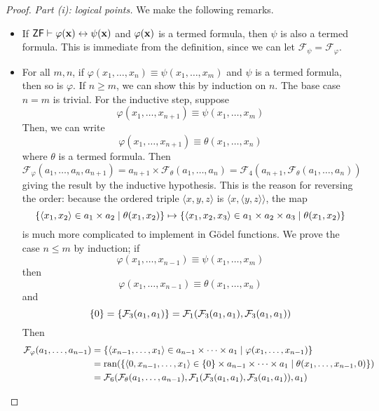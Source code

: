 \begin{proof}
    \emph{Part (i): logical points.}
    We make the following remarks.
    \begin{itemize}
        \item If \( \mathsf{ZF} \vdash \varphi(\vb x) \leftrightarrow \psi(\vb x) \) and \( \varphi(\vb x) \) is a termed formula, then \( \psi \) is also a termed formula.
        This is immediate from the definition, since we can let \( \mathcal F_\psi = \mathcal F_\varphi \).
        \item For all \( m, n \), if \( \varphi(x_1, \dots, x_n) \equiv \psi(x_1, \dots, x_m) \) and \( \psi \) is a termed formula, then so is \( \varphi \).
        If \( n \geq m \), we can show this by induction on \( n \).
        The base case \( n = m \) is trivial.
        For the inductive step, suppose
        \[ \varphi(x_1, \dots, x_{n+1}) \equiv \psi(x_1, \dots, x_m) \]
        Then, we can write
        \[ \varphi(x_1, \dots, x_{n+1}) \equiv \theta(x_1, \dots, x_n) \]
        where \( \theta \) is a termed formula.
        Then
        \[ \mathcal F_\varphi(a_1, \dots, a_n, a_{n+1}) = a_{n+1} \times \mathcal F_\theta(a_1, \dots, a_n) = \mathcal F_4(a_{n+1}, \mathcal F_\theta(a_1, \dots, a_n)) \]
        giving the result by the inductive hypothesis.
        This is the reason for reversing the order: because the ordered triple \( \langle x, y, z \rangle \) is \( \langle x, \langle y, z \rangle \rangle \), the map
        \[ \qty{\langle x_1, x_2 \rangle \in a_1 \times a_2 \mid \theta(x_1, x_2)} \mapsto \qty{\langle x_1, x_2, x_3 \rangle \in a_1 \times a_2 \times a_3 \mid \theta(x_1, x_2)} \]
        is much more complicated to implement in G\"odel functions.
        We prove the case \( n \leq m \) by induction; if
        \[ \varphi(x_1, \dots, x_{n-1}) \equiv \psi(x_1, \dots, x_m) \]
        then
        \[ \varphi(x_1, \dots, x_{n-1}) \equiv \theta(x_1, \dots, x_n) \]
        and
        \[ \qty{0} = \qty{\mathcal F_3(a_1, a_1)} = \mathcal F_1(\mathcal F_3(a_1, a_1), \mathcal F_3(a_1, a_1)) \]
        Then
        \begin{align*}
            \mathcal F_\varphi(a_1, \dots, a_{n-1}) &= \qty{\langle x_{n-1}, \dots, x_1 \rangle \in a_{n-1} \times \dots \times a_1 \mid \varphi(x_1, \dots, x_{n-1})} \\
            &= \operatorname{ran}(\qty{\langle 0, x_{n-1}, \dots, x_1 \rangle \in \qty{0} \times a_{n-1} \times \dots \times a_1 \mid \theta(x_1, \dots, x_{n-1}, 0)}) \\
            &= \mathcal F_6(\mathcal F_\theta(a_1, \dots, a_{n-1}), \mathcal F_1(\mathcal F_3(a_1, a_1), \mathcal F_3(a_1, a_1)), a_1)

\end{align*}
\end{itemize}
\end{proof}
